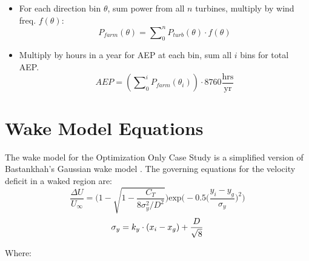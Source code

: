 \documentclass[12pt]{article}
\begin{document}
\begin{enumerate}[parsep=0pt,partopsep=0pt]
\begin{itemize}[noitemsep,topsep=0pt,parsep=0pt,partopsep=0pt]
            \item For each direction bin $\theta$, sum power from all $n$ turbines, multiply by wind freq. $f(\theta)$:
                \begin{equation*}
                    P_{farm}(\theta) = \sum\nolimits_{0}^{n} P_{turb}(\theta) \cdot f(\theta)
                \end{equation*}
            \item Multiply by hours in a year for AEP at each bin, sum all $i$ bins for total AEP.
                \begin{equation*}
                    AEP = \left(\sum\nolimits_{0}^{i} P_{farm}({\theta}_{i})\right) \cdot 8760 \frac{\textrm{hrs}}{\textrm{yr}}
                \end{equation*}
        \end{itemize}
    \end{enumerate}

\newpage
\section*{Wake Model Equations}
    The wake model for the Optimization Only Case Study is a simplified version of Bastankhah's Gaussian wake model \cite{Thomas2018}. The governing equations for the velocity deficit in a waked region are:\\
    \begin{equation}
        \frac{\Delta U}{U_{\infty}}
        =
        \Bigg(
            1 - \sqrt{
                1 - \frac{C_T}
                    {8\sigma_{y}^{2}/D^2}
                }
        \Bigg)
                \text{exp}\bigg(
                    -0.5\Big(
                        \frac{y_{i}-y_{g}}{\sigma_{y}}
                    \Big)^2
                \bigg)
        \label{Eq:Bast}
    \end{equation}
    \begin{equation}
        \sigma_y = k_y\cdot (x_{i}-x_{g}) + \frac{D}{\sqrt{8}} \\
        \label{Eq:SigY}
    \end{equation}
    
    Where:
    
\end{document}
